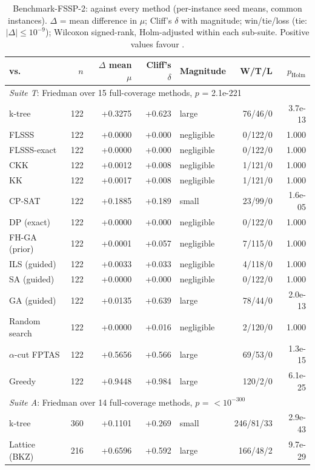 \begin{table}[htbp]
\caption{Benchmark-FSSP-2: \algname{} against every method (per-instance seed means, common instances). $\Delta$ = mean difference in $\mu$; Cliff's $\delta$ with magnitude; win/tie/loss (tie: $|\Delta|\le10^{-9}$); Wilcoxon signed-rank, Holm-adjusted within each sub-suite. Positive values favour \algname.}
\label{tab:fssp2stats}
\begin{tabular}{lrrrlrr}
\toprule
vs. & $n$ & $\Delta$ mean $\mu$ & Cliff's $\delta$ & Magnitude & W/T/L & $p_{\mathrm{Holm}}$ \\
\midrule
\multicolumn{7}{l}{\emph{Suite T}: Friedman over 15 full-coverage methods, $p$ = 2.1e-221} \\
k-tree & 122 & +0.3275 & +0.623 & large & 76/46/0 & 3.7e-13 \\
FLSSS & 122 & +0.0000 & +0.000 & negligible & 0/122/0 & 1.000 \\
FLSSS-exact & 122 & +0.0000 & +0.000 & negligible & 0/122/0 & 1.000 \\
CKK & 122 & +0.0012 & +0.008 & negligible & 1/121/0 & 1.000 \\
KK & 122 & +0.0017 & +0.008 & negligible & 1/121/0 & 1.000 \\
CP-SAT & 122 & +0.1885 & +0.189 & small & 23/99/0 & 1.6e-05 \\
DP (exact) & 122 & +0.0000 & +0.000 & negligible & 0/122/0 & 1.000 \\
FH-GA (prior) & 122 & +0.0001 & +0.057 & negligible & 7/115/0 & 1.000 \\
ILS (guided) & 122 & +0.0033 & +0.033 & negligible & 4/118/0 & 1.000 \\
SA (guided) & 122 & +0.0000 & +0.000 & negligible & 0/122/0 & 1.000 \\
GA (guided) & 122 & +0.0135 & +0.639 & large & 78/44/0 & 2.0e-13 \\
Random search & 122 & +0.0000 & +0.016 & negligible & 2/120/0 & 1.000 \\
$\alpha$-cut FPTAS & 122 & +0.5656 & +0.566 & large & 69/53/0 & 1.3e-15 \\
Greedy & 122 & +0.9448 & +0.984 & large & 120/2/0 & 6.1e-25 \\
\midrule
\multicolumn{7}{l}{\emph{Suite A}: Friedman over 14 full-coverage methods, $p$ = $<10^{-300}$} \\
k-tree & 360 & +0.1101 & +0.269 & small & 246/81/33 & 2.9e-43 \\
Lattice (BKZ) & 216 & +0.6596 & +0.592 & large & 166/48/2 & 9.7e-29 \\

\end{tabular}
\end{table}
